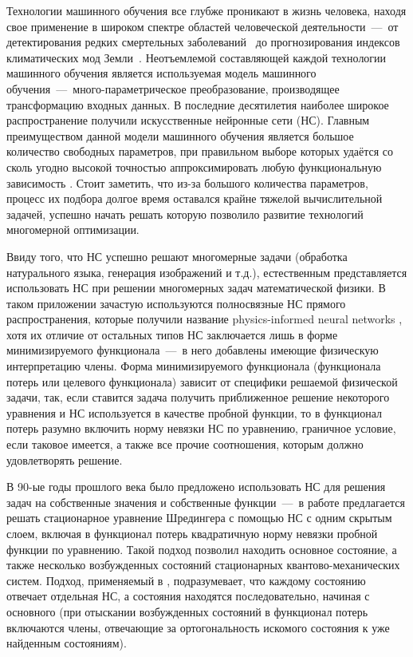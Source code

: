 Технологии машинного обучения все глубже проникают в жизнь человека, находя свое применение в широком спектре областей человеческой деятельности~---~от детектирования редких смертельных заболеваний~\cite{rock_et_al_2022} до прогнозирования индексов климатических мод Земли~\cite{zane_et_al_2022}. Неотъемлемой составляющей каждой технологии машинного обучения является используемая модель машинного обучения~---~много-параметрическое преобразование, производящее трансформацию входных данных. В последние десятилетия наиболее широкое распространение получили искусственные нейронные сети (НС). Главным преимуществом данной модели машинного обучения является большое количество свободных параметров, при правильном выборе которых удаётся со сколь угодно высокой точностью аппроксимировать любую функциональную зависимость \cite{hornik_et_al_1989}. Стоит заметить, что из-за большого количества параметров, процесс их подбора долгое время оставался крайне тяжелой вычислительной задачей, успешно начать решать которую позволило развитие технологий многомерной оптимизации.

Ввиду того, что НС успешно решают многомерные задачи (обработка натурального языка, генерация изображений и т.д.), естественным представляется использовать НС при решении многомерных задач математической физики. В таком приложении зачастую используются полносвязные НС прямого распространения, которые получили название physics-informed neural networks \cite{raissi_et_al_2017}, хотя их отличие от остальных типов НС заключается лишь в форме минимизируемого функционала~---~в него добавлены имеющие физическую интерпретацию члены. Форма минимизируемого функционала (функционала потерь или целевого функционала) зависит от специфики решаемой физической задачи, так, если ставится задача получить приближенное решение некоторого уравнения и НС используется в качестве пробной функции, то в функционал потерь разумно включить норму невязки НС по уравнению, граничное условие, если таковое имеется, а также все прочие соотношения, которым должно удовлетворять решение.

В 90-ые годы прошлого века было предложено использовать НС для решения задач на собственные значения и собственные функции~---~в работе \cite{lagaris_et_al_1997} предлагается решать стационарное уравнение Шредингера с помощью НС с одним скрытым слоем, включая в функционал потерь квадратичную норму невязки пробной функции по уравнению. Такой подход позволил находить основное состояние, а также несколько возбужденных состояний стационарных квантово-механических систем. Подход, применяемый в \cite{lagaris_et_al_1997}, подразумевает, что каждому состоянию отвечает отдельная НС, а состояния находятся последовательно, начиная с основного (при отыскании возбужденных состояний в функционал потерь включаются члены, отвечающие за ортогональность искомого состояния к уже найденным состояниям).

